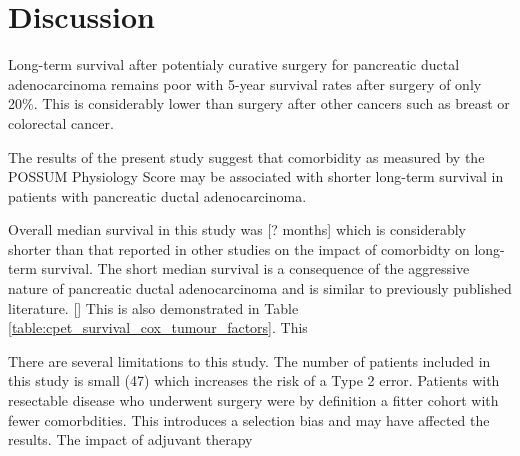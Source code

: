 
\section{Discussion}

Long-term survival after potentialy curative surgery for pancreatic ductal adenocarcinoma remains poor with 5-year survival rates after surgery of only 20\%. This is considerably lower than surgery after other cancers such as breast or colorectal cancer.\parencite{cancerresearchuk_cancer_2014}

The results of the present study suggest that comorbidity as measured by the POSSUM Physiology Score may be associated with shorter long-term survival in patients with pancreatic ductal adenocarcinoma. 




Overall median survival in this study was [? months] which is considerably shorter than that reported in other studies on the impact of comorbidty on long-term survival. The short median survival is a consequence of the aggressive nature of pancreatic ductal adenocarcinoma and is similar to previously published literature. [] This is also demonstrated in Table \ref{table:cpet_survival_cox_tumour_factors}. This 



There are several limitations to this study. The number of patients included in this study is small (47) which increases the risk of a Type 2 error. Patients with resectable disease who underwent surgery were by definition a fitter cohort with fewer comorbdities. This introduces a selection bias and may have affected the results. The impact of adjuvant therapy 